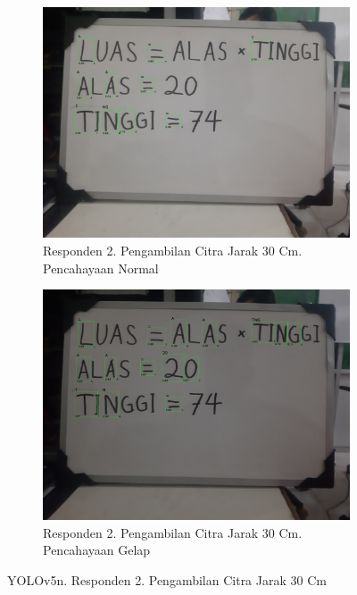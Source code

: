 \begin{figure}[H]
  \begin{subfigure}{.5\textwidth}
    \centering
    \captionsetup{width=.8\linewidth}
    \includegraphics[width=.8\linewidth]{gambar/yolov5n/responden2/ghiyas30cm00-result.jpg}
    \caption{Responden 2. Pengambilan Citra Jarak 30 Cm. Pencahayaan Normal}
    \label{fig:nr2tcitra30cm}
  \end{subfigure}%
  \begin{subfigure}{.5\textwidth}
    \centering
    \captionsetup{width=.8\linewidth}
    \includegraphics[width=.8\linewidth]{gambar/yolov5n/responden2/ghiyas30cm10-result.jpg}
    \caption{Responden 2. Pengambilan Citra Jarak 30 Cm. Pencahayaan Gelap}
    \label{fig:nr2gcitra30cm}
  \end{subfigure}
  \caption{YOLOv5n. Responden 2. Pengambilan Citra Jarak 30 Cm}
  \label{fig:nr2citra30cm}
\end{figure}

